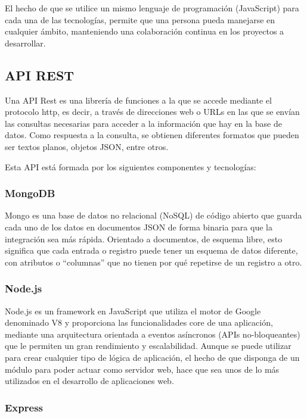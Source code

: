 \pagebreak
El hecho de que se utilice un mismo lenguaje de programación (JavaScript) para
cada una de las tecnologías, permite que una persona pueda manejarse en
cualquier ámbito, manteniendo una colaboración continua en los proyectos a
desarrollar.

\subsection{API REST}

Una API Rest es una librería de funciones a la que se accede mediante el
protocolo http, es decir, a través de direcciones web o URLs en las que se envían
las consultas necesarias para acceder a la información que hay en la base de
datos. Como respuesta a la consulta, se obtienen diferentes formatos que
pueden ser textos planos, objetos JSON, entre otros.

Esta API está formada por los siguientes componentes y tecnologías:

\subsubsection{MongoDB}

Mongo es una base de datos no relacional (NoSQL) de código abierto que
guarda cada uno de los datos en documentos JSON de forma binaria para que la integración sea más rápida. 
Orientado a documentos, de esquema libre, esto significa que cada entrada o registro puede tener un esquema de datos diferente, con atributos o “columnas” que no tienen por qué repetirse de un registro a otro.

\subsubsection{Node.js}

Node.js es un framework en JavaScript que utiliza el motor de Google
denominado V8 y proporciona las funcionalidades core de una aplicación,
mediante una arquitectura orientada a eventos asíncronos (APIs no-bloqueantes) que le permiten un gran rendimiento y escalabilidad.
Aunque se puede utilizar para crear cualquier tipo de lógica de aplicación, el
hecho de que disponga de un módulo para poder actuar como servidor web,
hace que sea unos de lo más utilizados en el desarrollo de aplicaciones web.

\subsubsection{Express}

